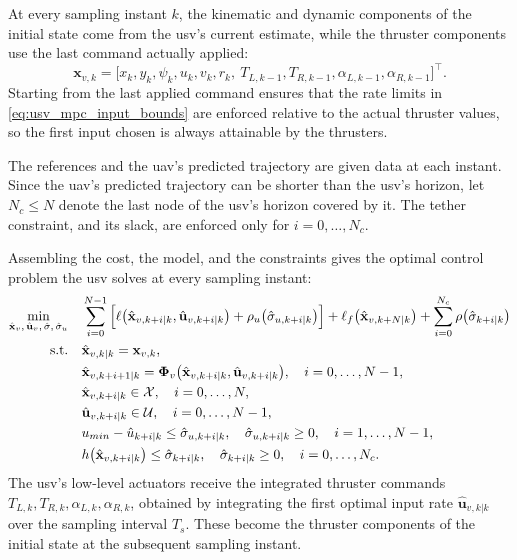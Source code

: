 At every sampling instant $k$, the kinematic and dynamic components of the initial state come from the \gls{usv}'s current estimate, while the thruster components use the last command actually applied:
\begin{equation}
    \mathbf{x}_{v,k} = \big[x_k, y_k, \psi_k, u_k, v_k, r_k,\ T_{L,k-1}, T_{R,k-1}, \alpha_{L,k-1}, \alpha_{R,k-1}\big]^\top.
    \label{eq:usv_mpc_initial_condition}
\end{equation}
Starting from the last applied command ensures that the rate limits in \eqref{eq:usv_mpc_input_bounds} are enforced relative to the actual thruster values, so the first input chosen is always attainable by the thrusters.

The references and the \gls{uav}'s predicted trajectory are given data at each instant. Since the \gls{uav}'s predicted trajectory can be shorter than the \gls{usv}'s horizon, let $N_c \le N$ denote the last node of the \gls{usv}'s horizon covered by it. The tether constraint, and its slack, are enforced only for $i = 0, \dots, N_c$.
 
Assembling the cost, the model, and the constraints gives the optimal control problem the \gls{usv} solves at every sampling instant:
\begin{align}
    \min_{\hat{\mathbf{x}}_v,\, \hat{\mathbf{u}}_v,\, \hat{\sigma},\, \hat{\sigma}_u} \quad & \sum_{i=0}^{N-1} \Big[ \ell\big(\hat{\mathbf{x}}_{v,k+i|k}, \hat{\mathbf{u}}_{v,k+i|k}\big) + \rho_u\big(\hat\sigma_{u,k+i|k}\big) \Big] + \ell_f\big(\hat{\mathbf{x}}_{v,k+N|k}\big) + \sum_{i=0}^{N_c} \rho\big(\hat\sigma_{k+i|k}\big) \notag \\
    \text{s.t.} \quad & \hat{\mathbf{x}}_{v,k|k} = \mathbf{x}_{v,k}, \notag \\
    & \hat{\mathbf{x}}_{v,k+i+1|k} = \boldsymbol\Phi_v\big(\hat{\mathbf{x}}_{v,k+i|k}, \hat{\mathbf{u}}_{v,k+i|k}\big), \quad i = 0, \dots, N-1, \notag \\
    & \hat{\mathbf{x}}_{v,k+i|k} \in \mathcal{X}, \quad i = 0, \dots, N, \notag \\
    & \hat{\mathbf{u}}_{v,k+i|k} \in \mathcal{U}, \quad i = 0, \dots, N-1, \notag \\
    & u_{min} - \hat u_{k+i|k} \le \hat\sigma_{u,k+i|k}, \quad \hat\sigma_{u,k+i|k} \ge 0, \quad i = 1, \dots, N-1, \notag \\
    & h\big(\hat{\mathbf{x}}_{v,k+i|k}\big) \le \hat\sigma_{k+i|k}, \quad \hat\sigma_{k+i|k} \ge 0, \quad i = 0, \dots, N_c. \label{eq:usv_mpc_ocp}
\end{align}
The \gls{usv}'s low-level actuators receive the integrated thruster commands $T_{L,k}, T_{R,k}, \alpha_{L,k}, \alpha_{R,k}$, obtained by integrating the first optimal input rate $\hat{\mathbf{u}}_{v,k|k}$ over the sampling interval $T_s$. These become the thruster components of the initial state at the subsequent sampling instant.
 
